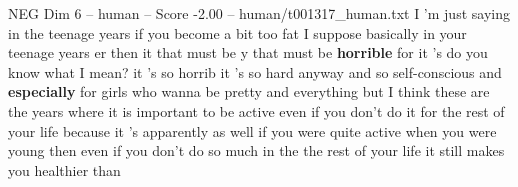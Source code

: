 \begin{textsample}{NEG Dim 6 – human – Score -2.00 – human/t001317\_human.txt}  \label{ex:f6_neg_032}
I 'm just saying in the teenage years if you become a bit too fat I suppose basically in your teenage years er then it that must be y that must be \textbf{horrible} for it 's do you know what I mean? it 's so horrib it 's so hard anyway and so self-conscious and \textbf{especially} for girls who wanna be pretty and everything but I think these are the years where it is important to be active even if you don't do it for the rest of your life because it 's apparently as well if you were quite active when you were young then even if you don't do so much in the the rest of your life it still makes you healthier than

\end{textsample}
